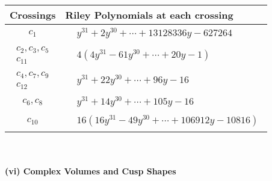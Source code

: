 \documentclass[1p]{elsarticle_modified}
\theoremstyle{definition}
\begin{document}
\begin{tabular}{m{50pt}|m{274pt}}
Crossings & \hspace{64pt}Riley Polynomials at each crossing \\
\hline $$\begin{aligned}c_{1}\end{aligned}$$&$\begin{aligned}
&y^{31}+2 y^{30}+\cdots+13128336 y-627264
\end{aligned}$\\
\hline $$\begin{aligned}c_{2},c_{3},c_{5}\\c_{11}\end{aligned}$$&$\begin{aligned}
&4(4 y^{31}-61 y^{30}+\cdots+20 y-1)
\end{aligned}$\\
\hline $$\begin{aligned}c_{4},c_{7},c_{9}\\c_{12}\end{aligned}$$&$\begin{aligned}
&y^{31}+22 y^{30}+\cdots+96 y-16
\end{aligned}$\\
\hline $$\begin{aligned}c_{6},c_{8}\end{aligned}$$&$\begin{aligned}
&y^{31}+14 y^{30}+\cdots+105 y-16
\end{aligned}$\\
\hline $$\begin{aligned}c_{10}\end{aligned}$$&$\begin{aligned}
&16(16 y^{31}-49 y^{30}+\cdots+106912 y-10816)
\end{aligned}$\\
\hline
\end{tabular}\\~\\
\newpage\flushleft \textbf{(vi) Complex Volumes and Cusp Shapes}
\end{document}
